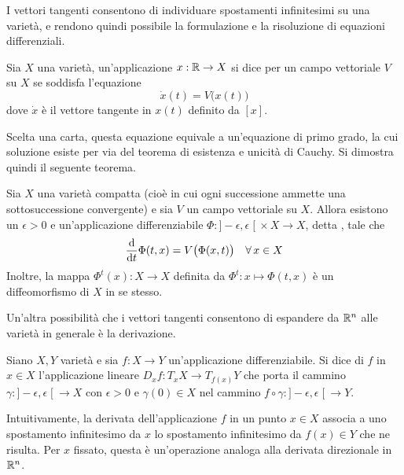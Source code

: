 I vettori tangenti consentono di individuare spostamenti infinitesimi su una varietà, e rendono quindi possibile la formulazione e la risoluzione di equazioni differenziali.

\begin{definition}
  Sia $X$ una varietà, un'applicazione $x:\mathbb{R} \to X$ si dice  per un campo vettoriale $V$ su $X$ se soddisfa l'equazione \begin{equation*}
  \dot{x}(t) = V\big(x(t)\big)
  \end{equation*} 
  dove $\dot{x}$ è il vettore tangente in $x(t)$ definito da $[x]$.
\end{definition}
\begin{remark}
  Scelta una carta, questa equazione equivale a un'equazione di primo grado, la cui soluzione esiste per via del teorema di esistenza e unicità di Cauchy. Si dimostra quindi il seguente teorema.
\end{remark}
\begin{theorem}
  Sia $X$ una varietà compatta (cioè in cui ogni successione ammette una sottosuccessione convergente) e sia $V$ un campo vettoriale su $X$. Allora esistono un $\epsilon > 0$ e un'applicazione differenziabile $\Phi:]-\epsilon, \epsilon\;[\ \times X \to X$, detta , tale che \begin{equation*}
  \dv{t} \Phi(t,x) = V\big( \Phi(x,t)\big) \quad \forall\, x \in  X
  \end{equation*} 
  Inoltre, la mappa $\Phi^t(x):X \to X$ definita da $\Phi^t:x \mapsto \Phi(t,x)$ è un diffeomorfismo di $X$ in se stesso.
\end{theorem}

Un'altra possibilità che i vettori tangenti consentono di espandere da $\mathbb{R}^{n}$ alle varietà in generale è la derivazione.
\begin{definition}
  Siano $X,Y$ varietà e sia $f:X\to Y$ un'applicazione differenziabile. Si dice  di $f$ in $x \in X$ l'applicazione lineare $D_x f:T_x X \to T_{f(x)}Y$ che porta il cammino $\gamma: ]-\epsilon, \epsilon\;[\ \to X$ con $\epsilon>0$ e $\gamma(0) \in X$ nel cammino $f \circ \gamma:]-\epsilon, \epsilon\;[\ \to Y$.
\end{definition}
\begin{remark}
  Intuitivamente, la derivata dell'applicazione $f$ in un punto $x \in X$ associa a uno spostamento infinitesimo da $x$ lo spostamento infinitesimo da $f(x) \in Y$ che ne risulta. Per $x$ fissato, questa è un'operazione analoga alla derivata direzionale in $\mathbb{R}^{n}$.
\end{remark}

